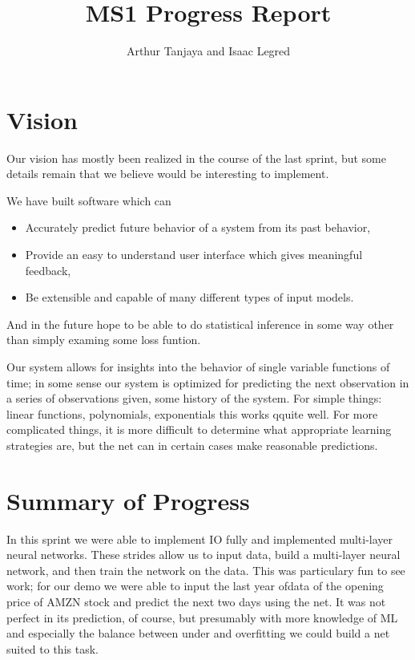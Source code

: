 \documentclass{article}
\title{MS1 Progress Report}
\author{Arthur Tanjaya and Isaac Legred}
\begin{document}
\maketitle

\section{Vision}
\label{sec:vision}

Our vision has mostly been realized in the course of the last sprint, but some details remain that we believe would be interesting to implement.  

We have built software which can
\begin{itemize}
  \item Accurately predict future behavior of a system from its past behavior,
  \item Provide an easy to understand user interface which gives meaningful feedback,
  \item Be extensible and capable of many different types of input models.
\end{itemize}

And in the future hope to be able to do statistical inference in some way other than simply examing some loss funtion.

Our system allows for insights into the behavior of single variable functions of time; in some sense our system is optimized for predicting the next observation in a series of observations given, some history of the system.  For simple things: linear functions, polynomials, exponentials this works qquite well.  For more complicated things, it is more difficult to determine what appropriate learning strategies are, but the net can in certain cases make reasonable predictions.  
\section{Summary of Progress}
\label{sec:summary}

In this sprint we were able to implement IO fully and implemented multi-layer neural networks.  These strides allow us to input data, build a multi-layer neural network, and then train the network on the data.  This was particulary fun to see work; for our demo we were able to input the last year ofdata of the opening price of AMZN stock and predict the next two days using the net.  It was not perfect in its prediction, of course, but presumably with more knowledge of ML and especially the balance between under and overfitting we could build a net suited to this task.
\end{document}
